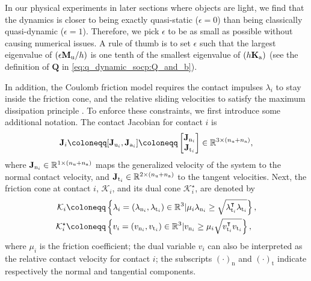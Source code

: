 In our physical experiments in later sections where objects are light, we find that the dynamics is closer to being exactly quasi-static ($\epsilon = 0$) than being classically quasi-dynamic ($\epsilon = 1$). Therefore, we pick $\epsilon$ to be as small as possible without causing numerical issues. A rule of thumb is to set $\epsilon$ such that the largest eigenvalue of $(\epsilon \Mu / h)$ is one tenth of the smallest eigenvalue of $(h \Ka)$ (see the definition of $\mathbf{Q}$ in \eqref{eq:q_dynamic_socp:Q_and_b}).

In addition, the Coulomb friction model requires the contact impulses $\lambda_i$ to stay inside the friction cone, and the relative sliding velocities to satisfy the maximum dissipation principle \cite{stewart2000rigid}. To enforce these constraints, we first introduce some additional notation. The contact Jacobian for contact $i$ is 
\begin{equation}
\label{eq:contact_jacobian_i}
\J_i \coloneqq [\Ju[i], \Ja[i]] \coloneqq 
\begin{bmatrix}
\Jn[i] \\
\Jt[i]
\end{bmatrix}
\in \R[3 \times (\nU + \nA)],
\end{equation}
where $\Jn[i] \in \R[1 \times (\nU + \nA)]$ maps the generalized velocity of the system to the normal contact velocity, and $\Jt[i] \in \R[2 \times (\nU + \nA)]$ to the tangent velocities. Next, the friction cone at contact $i$, $\mathcal{K}_i$, and its dual cone $\mathcal{K}_i^\star$, are denoted by
\begin{subequations}
\label{eq:contact_cones}
\begin{align}
\mathcal{K}_i &\coloneqq \left\{\lambda_i = (\lambda_{\mathrm{n}_i}, \lambda_{\mathrm{t}_i}) \in \R[3] | \mu_i \lambda_{\mathrm{n}_i} \geq \sqrt{\lambda_{\mathrm{t}_i}^\intercal \lambda_{\mathrm{t}_i}} \right\}, \label{eq:contact_cones:lambda}\\
\mathcal{K}_i^\star &\coloneqq \left\{v_i = (v_{\mathrm{n}_i}, v_{\mathrm{t}_i}) \in \R[3] | v_{\mathrm{n}_i} \geq \mu_i \sqrt{v_{\mathrm{t}_i}^\intercal v_{\mathrm{t}_i}} \right\}, \label{eq:contact_cones:v}
\end{align}
\end{subequations}
where $\mu_i$ is the friction coefficient; the dual variable $v_i$ can also be interpreted as the relative contact velocity for contact $i$; the subscripts $(\cdot)_\mathrm{n}$ and $(\cdot)_\mathrm{t}$ indicate respectively the normal and tangential components. 

